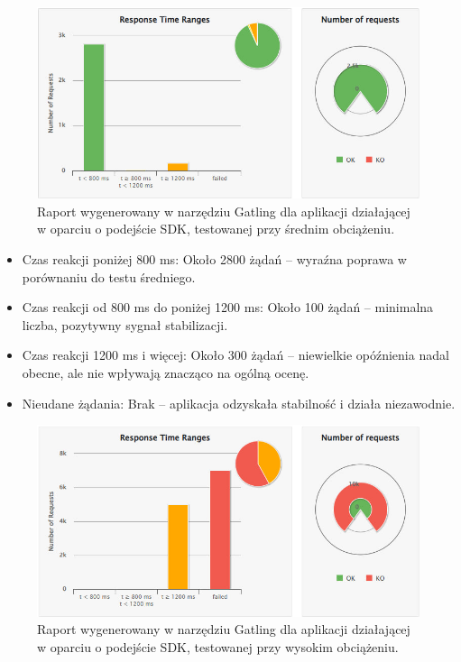 \documentclass[runningheads,12pt]{llncs}
\begin{document}
\newpage

\begin{figure}
    \centering
    \includegraphics[width=0.8\linewidth]{images/sdk-gatling-middle-graph.jpg}
    \caption{Raport wygenerowany w narzędziu Gatling dla aplikacji działającej w oparciu o podejście SDK, testowanej przy średnim obciążeniu.}
    \label{fig:middle}
\end{figure}

\begin{itemize}
    \item Czas reakcji poniżej 800 ms: Około 2800 żądań – wyraźna poprawa w porównaniu do testu średniego.
    \item Czas reakcji od 800 ms do poniżej 1200 ms: Około 100 żądań – minimalna liczba, pozytywny sygnał stabilizacji.
    \item Czas reakcji 1200 ms i więcej: Około 300 żądań – niewielkie opóźnienia nadal obecne, ale nie wpływają znacząco na ogólną ocenę.
    \item Nieudane żądania: Brak – aplikacja odzyskała stabilność i działa niezawodnie.
\end{itemize}

\newpage

\begin{figure}
    \centering
    \includegraphics[width=0.8\linewidth]{images/sdk-gatling-high-graph.jpg}
    \caption{Raport wygenerowany w narzędziu Gatling dla aplikacji działającej w oparciu o podejście SDK, testowanej przy wysokim obciążeniu.}
    \label{fig:high}
\end{figure}
\end{document}
